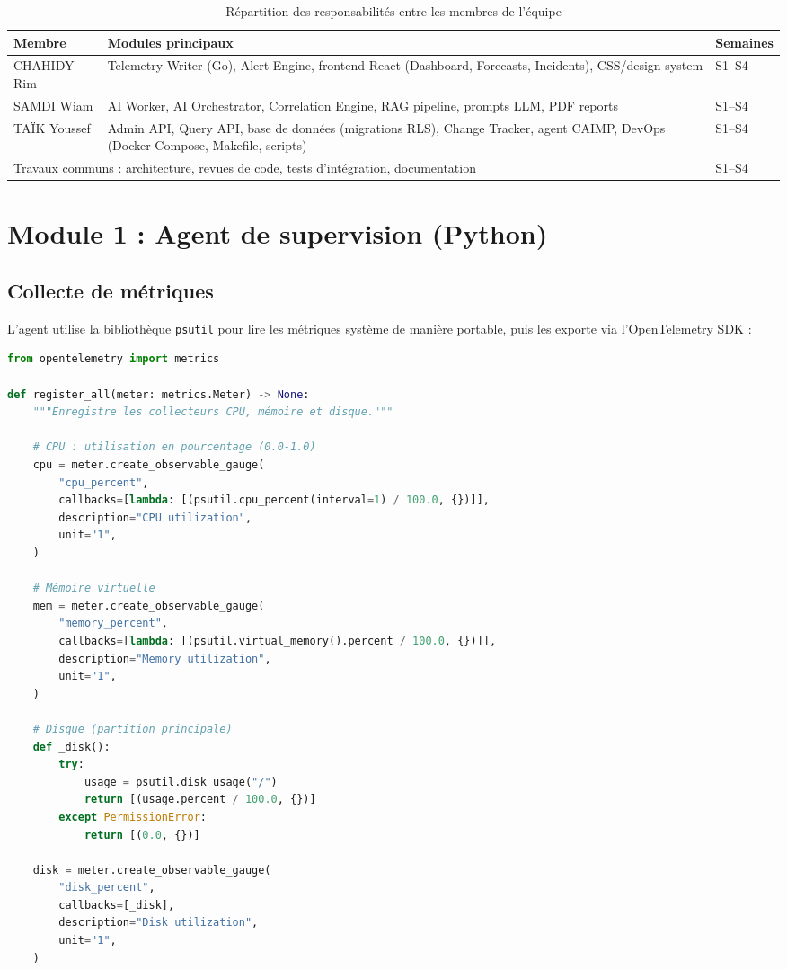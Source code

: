 \begin{table}[H]
\centering
\caption{Répartition des responsabilités entre les membres de l'équipe}
\label{tab:repartition}
\begin{tabularx}{\textwidth}{lXl}
\toprule
\textbf{Membre} & \textbf{Modules principaux} & \textbf{Semaines} \\
\midrule
CHAHIDY Rim  & Telemetry Writer (Go), Alert Engine, frontend React
               (Dashboard, Forecasts, Incidents), CSS/design system & S1--S4 \\
SAMDI Wiam   & AI Worker, AI Orchestrator, Correlation Engine,
               RAG pipeline, prompts LLM, PDF reports & S1--S4 \\
TAÏK Youssef & Admin API, Query API, base de données (migrations RLS),
               Change Tracker, agent CAIMP, DevOps (Docker Compose,
               Makefile, scripts) & S1--S4 \\
\midrule
\multicolumn{2}{l}{Travaux communs : architecture, revues de code, tests d'intégration,
  documentation} & S1--S4 \\
\bottomrule
\end{tabularx}
\end{table}

\section{Module 1 : Agent de supervision (Python)}

\subsection{Collecte de métriques}

L'agent utilise la bibliothèque \texttt{psutil} pour lire les métriques système
de manière portable, puis les exporte via l'OpenTelemetry SDK :

\begin{lstlisting}[language=Python, caption={Extrait de \texttt{caimp\_agent/collectors.py}}]
from opentelemetry import metrics

def register_all(meter: metrics.Meter) -> None:
    """Enregistre les collecteurs CPU, mémoire et disque."""

    # CPU : utilisation en pourcentage (0.0-1.0)
    cpu = meter.create_observable_gauge(
        "cpu_percent",
        callbacks=[lambda: [(psutil.cpu_percent(interval=1) / 100.0, {})]],
        description="CPU utilization",
        unit="1",
    )

    # Mémoire virtuelle
    mem = meter.create_observable_gauge(
        "memory_percent",
        callbacks=[lambda: [(psutil.virtual_memory().percent / 100.0, {})]],
        description="Memory utilization",
        unit="1",
    )

    # Disque (partition principale)
    def _disk():
        try:
            usage = psutil.disk_usage("/")
            return [(usage.percent / 100.0, {})]
        except PermissionError:
            return [(0.0, {})]

    disk = meter.create_observable_gauge(
        "disk_percent",
        callbacks=[_disk],
        description="Disk utilization",
        unit="1",
    )
\end{lstlisting}

